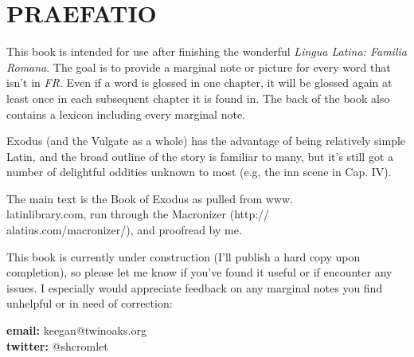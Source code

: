 \chapter{PRAEFATIO}

This book is intended for use after finishing the wonderful {\it Lingua Latina:
Familia Romana}.  The goal is to provide a marginal note or 
picture for every word that isn't in {\it FR}. Even if a word is glossed in 
one chapter, it will be glossed again at least once in each subsequent chapter
it is found in.  The back of the book also contains a lexicon including every marginal note. 

Exodus (and the Vulgate as a whole) has the advantage of being
relatively simple Latin, and the broad outline of
the story is familiar to many, but it's still got a number of delightful
oddities unknown to most (e.g, the inn scene in Cap. IV).

The main text is the Book of Exodus as pulled from www.\\latinlibrary.com,
run through the Macronizer (http://\\alatius.com/macronizer/), and proof\-read
by me.  

This book is currently under construction (I'll publish a hard copy upon completion),
so please let me know if you've found it useful or if encounter any issues.  I especially would appreciate feedback on
any marginal notes you find unhelpful or in need of correction:

\noindent
{\bf email:} keegan@twinoaks.org\\{\bf twitter:} @shcromlet
